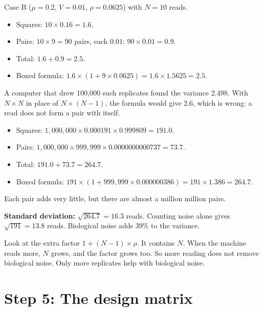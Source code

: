 \begin{worked}
Case B ($\mu = 0.2$, $V = 0.01$, $\rho = 0.0625$) with $N = 10$ reads.
\begin{itemize}[leftmargin=1.2em]
\item Squares: $10 \times 0.16 = 1.6$.
\item Pairs: $10 \times 9 = 90$ pairs, each $0.01$: $90 \times 0.01 = 0.9$.
\item Total: $1.6 + 0.9 = 2.5$.
\item Boxed formula: $1.6 \times (1 + 9 \times 0.0625) = 1.6 \times 1.5625
  = 2.5$.
\end{itemize}
A computer that drew 100{,}000 such replicates found the variance 2.498.
With $N \times N$ in place of $N \times (N-1)$, the formula would give 2.6,
which is wrong: a read does not form a pair with itself.
\end{worked}

\begin{worked}
\begin{itemize}[leftmargin=1.2em]
\item Squares: $1{,}000{,}000 \times 0.000191 \times 0.999809 = 191.0$.
\item Pairs: $1{,}000{,}000 \times 999{,}999 \times 0.0000000000737 = 73.7$.
\item Total: $191.0 + 73.7 = 264.7$.
\item Boxed formula: $191 \times (1 + 999{,}999 \times 0.000000386) = 191
  \times 1.386 = 264.7$.
\end{itemize}
Each pair adds very little, but there are almost a million million pairs.

\textbf{Standard deviation:} $\sqrt{264.7} = 16.3$ reads. Counting noise
alone gives $\sqrt{191} = 13.8$ reads. Biological noise adds 39\% to the
variance.
\end{worked}

\begin{remember}
Look at the extra factor $1 + (N-1) \times \rho$. It contains $N$. When the
machine reads more, $N$ grows, and the factor grows too. So more reading
does not remove biological noise. Only more replicates help with biological
noise.
\end{remember}

\section{Step 5: The design matrix}

